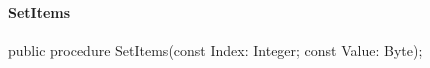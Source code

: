 \documentclass{report}
\newif\ifpdf
\begin{document}
\paragraph*{SetItems}\hspace*{\fill}

\label{ok_deprecated_default.TMyClass-SetItems}
\begin{list}{}{
\setlength{\itemindent}{0cm}
\setlength{\listparindent}{0cm}
\setlength{\leftmargin}{\evensidemargin}
\addtolength{\leftmargin}{\tmplength}
\settowidth{\labelsep}{X}
\addtolength{\leftmargin}{\labelsep}
\setlength{\labelwidth}{\tmplength}
}
\item[\textbf{Declaration}\hfill]
\ifpdf
\begin{flushleft}
\fi
\begin{ttfamily}
public procedure SetItems(const Index: Integer; const Value: Byte);\end{ttfamily}

\ifpdf
\end{flushleft}
\fi

\end{list}
\end{document}
